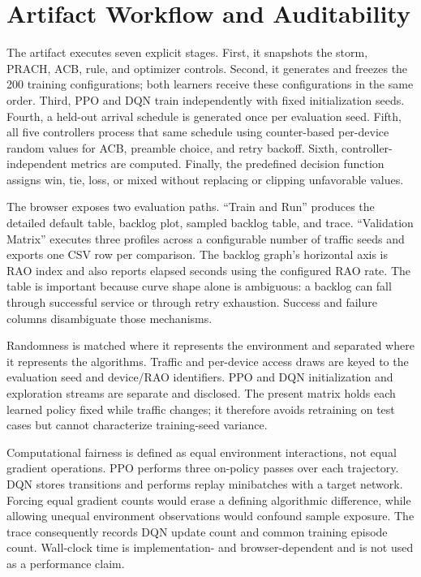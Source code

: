 \documentclass[conference]{IEEEtran}
\begin{document}
\section{Artifact Workflow and Auditability}
The artifact executes seven explicit stages. First, it snapshots the storm, PRACH, ACB, rule, and optimizer controls. Second, it generates and freezes the 200 training configurations; both learners receive these configurations in the same order. Third, PPO and DQN train independently with fixed initialization seeds. Fourth, a held-out arrival schedule is generated once per evaluation seed. Fifth, all five controllers process that same schedule using counter-based per-device random values for ACB, preamble choice, and retry backoff. Sixth, controller-independent metrics are computed. Finally, the predefined decision function assigns win, tie, loss, or mixed without replacing or clipping unfavorable values.

The browser exposes two evaluation paths. ``Train and Run'' produces the detailed default table, backlog plot, sampled backlog table, and trace. ``Validation Matrix'' executes three profiles across a configurable number of traffic seeds and exports one CSV row per comparison. The backlog graph's horizontal axis is RAO index and also reports elapsed seconds using the configured RAO rate. The table is important because curve shape alone is ambiguous: a backlog can fall through successful service or through retry exhaustion. Success and failure columns disambiguate those mechanisms.

Randomness is matched where it represents the environment and separated where it represents the algorithms. Traffic and per-device access draws are keyed to the evaluation seed and device/RAO identifiers. PPO and DQN initialization and exploration streams are separate and disclosed. The present matrix holds each learned policy fixed while traffic changes; it therefore avoids retraining on test cases but cannot characterize training-seed variance.

Computational fairness is defined as equal environment interactions, not equal gradient operations. PPO performs three on-policy passes over each trajectory. DQN stores transitions and performs replay minibatches with a target network. Forcing equal gradient counts would erase a defining algorithmic difference, while allowing unequal environment observations would confound sample exposure. The trace consequently records DQN update count and common training episode count. Wall-clock time is implementation- and browser-dependent and is not used as a performance claim.
\end{document}
